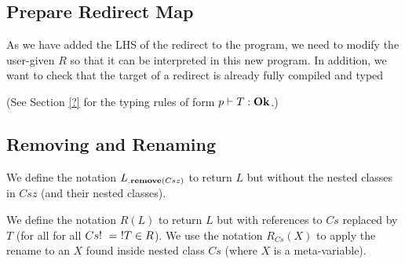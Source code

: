 \subsection{Prepare Redirect Map}
As we have added the LHS of the redirect to the program, we need to modify the user-given $R$ so that it can be interpreted in this new program. In addition, we want to check that the target of a redirect is already fully compiled and typed 

\begin{defs}
\end{defs}
(See Section \ref{?} for the typing rules of form $p \vdash T : \textbf{Ok}$.)

\subsection{Removing and Renaming}

We define the notation $L{{}_{.\textbf{remove}({Csz})}}$ to return $L$ but without the nested classes in $Csz$ (and their nested classes). 

\begin{defs}
\end{defs}

We define the notation $R(L)$ to return $L$ but with references to $Cs$ replaced by $T$ (for all for all $\redm{Cs}{T} \in R$). We use the notation $R_{Cs}(X)$ to apply the rename to an $X$ found inside nested class $Cs$ (where $X$ is a meta-variable).

\begin{defs}
\end{defs}

